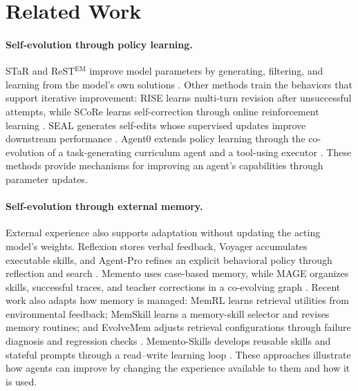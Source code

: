 
\section{Related Work}
\label{sec:related}


\paragraph{Self-evolution through policy learning.}
STaR and ReST$^{\mathrm{EM}}$ improve model parameters by generating, filtering, and learning from the model's own solutions \citep{zelikman2022star,singh2024restem}. Other methods train the behaviors that support iterative improvement: RISE learns multi-turn revision after unsuccessful attempts, while SCoRe learns self-correction through online reinforcement learning \citep{rise2024,score2024}. SEAL generates self-edits whose supervised updates improve downstream performance \citep{seal2025}. Agent0 extends policy learning through the co-evolution of a task-generating curriculum agent and a tool-using executor \citep{agentzero2025}. These methods provide mechanisms for improving an agent's capabilities through parameter updates.



\paragraph{Self-evolution through external memory.}
External experience also supports adaptation without updating the acting model's weights. Reflexion stores verbal feedback, Voyager accumulates executable skills, and Agent-Pro refines an explicit behavioral policy through reflection and search \citep{shinn2023reflexion,wang2023voyager,agentpro2024}. Memento uses case-based memory, while MAGE organizes skills, successful traces, and teacher corrections in a co-evolving graph \citep{memento2025,yang2026mage}. Recent work also adapts how memory is managed: MemRL learns retrieval utilities from environmental feedback; MemSkill learns a memory-skill selector and revises memory routines; and EvolveMem adjusts retrieval configurations through failure diagnosis and regression checks \citep{memrl2026,memskill2026,evolvemem2026}. Memento-Skills develops reusable skills and stateful prompts through a read--write learning loop \citep{mementoskills2026}. These approaches illustrate how agents can improve by changing the experience available to them and how it is used.



